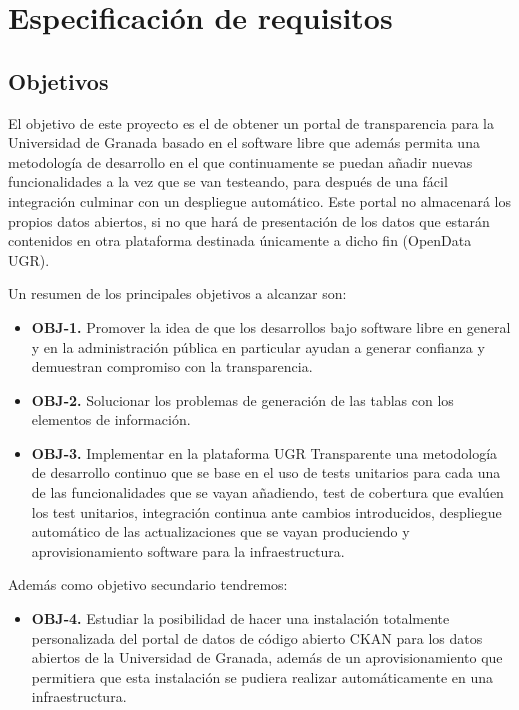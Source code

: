 \chapter{Especificación de requisitos}

\section{Objetivos}

El objetivo de este proyecto es el de obtener un portal de transparencia para la Universidad de Granada basado en el software 
libre que además permita una metodología de desarrollo en el que continuamente se puedan añadir nuevas funcionalidades a la 
vez que se van testeando, para después de una fácil integración culminar con un despliegue automático. Este portal no almacenará
los propios datos abiertos, si no que hará de presentación de los datos que estarán contenidos en otra plataforma destinada 
únicamente a dicho fin (OpenData UGR).

\bigskip
Un resumen de los principales objetivos a alcanzar son:

\begin{itemize}
  \item \textbf{OBJ-1.} Promover la idea de que los desarrollos bajo software libre en general y en la administración pública 
  en particular ayudan a generar confianza y demuestran compromiso con la transparencia.
  \item \textbf{OBJ-2.} Solucionar los problemas de generación de las tablas con los elementos de información.
  \item \textbf{OBJ-3.} Implementar en la plataforma UGR Transparente una metodología de desarrollo continuo que se base 
  en el uso de tests unitarios para cada una de las funcionalidades que se vayan añadiendo, test de 
  cobertura que evalúen los test unitarios, integración continua ante cambios introducidos, despliegue automático de las
  actualizaciones que se vayan produciendo y aprovisionamiento software para la infraestructura.
\end{itemize}

\newpage
Además como objetivo secundario tendremos:

\begin{itemize}
  \item \textbf{OBJ-4.} Estudiar la posibilidad de hacer una instalación totalmente personalizada del portal de datos de código
  abierto CKAN para los datos abiertos de la Universidad de Granada, además de un aprovisionamiento que permitiera que esta 
  instalación se pudiera realizar automáticamente en una infraestructura.
\end{itemize}


